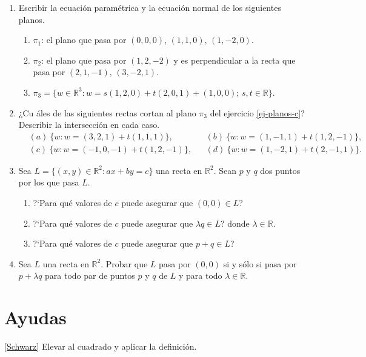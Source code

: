 \begin{enumerate}[resume,topsep=6pt, itemsep=.4cm]
\item\label{ej-planos} Escribir la ecuación paramétrica  y la ecuación normal de los siguientes planos.
\begin{enumerate}
    \item $\pi_1$: el plano que pasa por $(0,0,0)$, $(1,1,0)$, $(1,-2,0)$.
    \item $\pi_2$: el plano que pasa por $(1,2,-2)$ y es perpendicular a la
    recta que pasa por $(2,1,-1)$, $(3,-2,1)$.
    \item\label{ej-planos-c}  $\pi_3=\{w\in\mathbb{R}^3: w=s(1,2,0)+t(2,0,1)+(1,0,0);\,s,t\in \mathbb R\}$.
\end{enumerate}



\item ¿Cu áles de las siguientes rectas cortan al plano $\pi_3$ del  ejercicio  \ref{ej-planos-c}?
Describir la intersección en cada caso.
\begin{align*}
&(a) \ \{w: w=(3,2,1)+t(1,1,1)\}, && (b) \  \{w: w=(1,-1,1)+t(1,2,-1)\}, \\
&(c)\  \{w: w=(-1,0,-1)+t(1,2,-1)\}, && (d) \  \{w: w=(1,-2,1)+t(2,-1,1)\}.
\end{align*}


\item\label{rectas como subespacio} Sea $L=\{(x,y)\in\mathbb{R}^2 : ax+by=c\}$ una recta en $\mathbb{R}^2$. Sean $p$ y $q$ dos puntos por los que pasa $L$.
\begin{enumerate}
 \item ?`Para qué valores de $c$ puede asegurar que $(0,0)\in L$?
 \item ?`Para qué valores de $c$ puede asegurar que $\lambda q\in L$? donde $\lambda\in\mathbb{R}$.
 \item ?`Para qué valores de $c$ puede asegurar que $p+q\in L$?
\end{enumerate}


\item\label{rectas-por-el-0} Sea $L$ una recta en $\mathbb{R}^2$. Probar que $L$ pasa por $(0,0)$ si y sólo si pasa por $p+\lambda q$ para todo par de puntos $p$ y $q$ de $L$ y para todo $\lambda\in\mathbb{R}$.
\end{enumerate}


\section*{Ayudas}
 \ref{Schwarz} Elevar al cuadrado y aplicar la definición.

